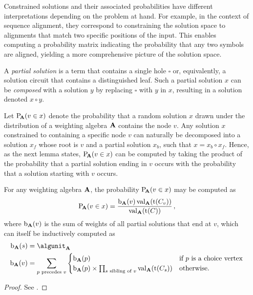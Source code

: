 Constrained solutions and their associated probabilities have different interpretations depending on the problem at hand.
For example, in the context of sequence alignment, they correspond to constraining the solution space to alignments that match two specific positions of the input.
This enables computing a probability matrix indicating the probability that any two symbols are aligned, yielding a more comprehensive picture of the solution space.

\begin{definition}
    A \emph{partial solution} is a term that contains a single hole \(\square\) or, equivalently, a solution circuit that contains a distinguished leaf.
    Such a partial solution \(x\) can be \emph{composed} with a solution \(y\) by replacing \(\square\) with \(y\) in \(x\), resulting in a solution denoted \(x \circ y\).
\end{definition}

Let \(\mathrm{P}\!_{\mathbf{A}}(v \in x)\) denote the probability that a random solution \(x\) drawn under the distribution of a weighting algebra \(\mathbf{A}\) contains the node \(v\).
Any solution \(x\) constrained to containing a specific node \(v\) can naturally be decomposed into a solution \(x_f\) whose root is \(v\) and a partial solution \(x_b\), such that \(x = x_b \circ x_f\).
Hence, as the next lemma states, \(\mathrm{P}\!_{\mathbf{A}}(v \in x)\) can be computed by taking the product of the probability that a partial solution ending in \(v\) occurs with the probability that a solution starting with \(v\) occurs.

\begin{lemma}
    For any weighting algebra \(\mathbf{A}\), the probability \(\mathrm{P}\!_{\mathbf{A}}(v \in x)\) may be computed as \[
    \mathrm{P}\!_{\mathbf{A}}(v \in x) = \frac{\mathrm{b}_{\mathbf{A}}(v) \operatorname{val}_{\mathbf{A}}(\operatorname{t}(C_v))}{\operatorname{val}_{\mathbf{A}}(\operatorname{t}(C))}\,,
\]
where \(\mathrm{b}_{\mathbf{A}}(v)\) is the sum of weights of all partial solutions that end at \(v\), which can itself be inductively computed as
\begin{align*}
    \back_\alg(s) &= \algunit_\alg \\
    \back_\alg(v) &= \sum_{p \text{ precedes } v}\begin{cases}
        \back_\alg(p) & \text{if } p \text{ is a choice vertex} \\
        \back_\alg(p) \times \prod_{s \text{ sibling of } v}{\algeval_\alg(\term(C_s))} & \text{otherwise.}
    \end{cases}
\end{align*}
\end{lemma}
\begin{proof}
    See \textcite{Ponty2011CombinatorialFrameworkDesigning}.
\end{proof}

